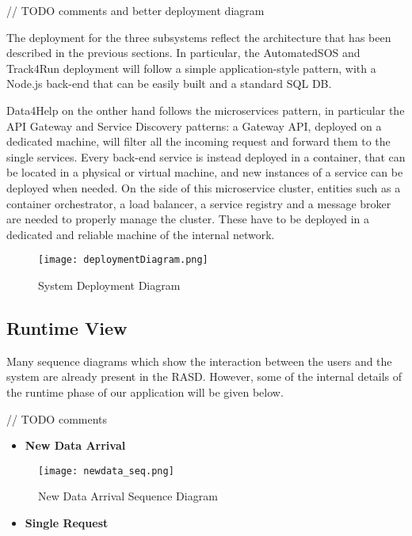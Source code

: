 // TODO comments and better deployment diagram

The deployment for the three subsystems reflect the architecture that has been described in the previous sections. In particular, the AutomatedSOS and Track4Run deployment will follow a simple application-style pattern, with a Node.js back-end that can be easily built and a standard SQL DB.

Data4Help on the onther hand follows the microservices pattern, in particular the API Gateway and Service Discovery patterns: a Gateway API, deployed on a dedicated machine, will filter all the incoming request and forward them to the single services. Every back-end service is instead deployed in a container, that can be located in a physical or virtual machine, and new instances of a service can be deployed when needed. On the side of this microservice cluster, entities such as a container orchestrator, a load balancer, a service registry and a message broker are needed to properly manage the cluster. These have to be deployed in a dedicated and reliable machine of the internal network.

\FloatBarrier
\begin{figure}[!h]
	\centering
	\texttt{[image: deploymentDiagram.png]}
	\caption{System Deployment Diagram}
\end{figure}
\FloatBarrier

\subsection{Runtime View}
Many sequence diagrams which show the interaction between the users and the system are already present in the RASD. However, some of the internal details of the runtime phase of our application will be given below.

// TODO comments

\begin{itemize}
	\item \textbf{New Data Arrival}
\end{itemize}

\FloatBarrier
\begin{figure}[!h]
	\centering
	\texttt{[image: newdata\_seq.png]}
	\caption{New Data Arrival Sequence Diagram}
\end{figure}
\FloatBarrier

\begin{itemize}
	\item \textbf{Single Request}
\end{itemize}

